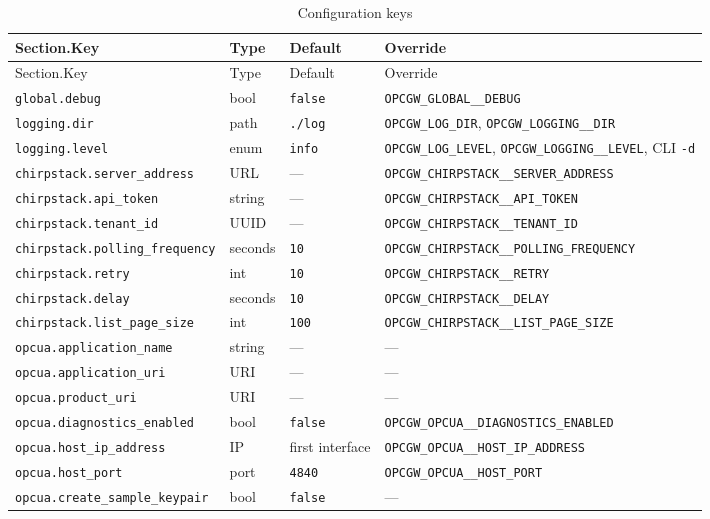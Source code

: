 \begin{longtable}[]{@{}llll@{}}
\caption{Configuration keys}\tabularnewline
\toprule\noalign{}
Section.Key & Type & Default & Override \\
\midrule\noalign{}
\endfirsthead
\toprule\noalign{}
Section.Key & Type & Default & Override \\
\midrule\noalign{}
\endhead
\bottomrule\noalign{}
\endlastfoot
\texttt{global.debug} & bool & \texttt{false} & \texttt{OPCGW\_GLOBAL\_\_DEBUG} \\
\texttt{logging.dir} & path & \texttt{./log} & \texttt{OPCGW\_LOG\_DIR}, \texttt{OPCGW\_LOGGING\_\_DIR} \\
\texttt{logging.level} & enum & \texttt{info} & \texttt{OPCGW\_LOG\_LEVEL}, \texttt{OPCGW\_LOGGING\_\_LEVEL}, CLI \texttt{-d} \\
\texttt{chirpstack.server\_address} & URL & --- & \texttt{OPCGW\_CHIRPSTACK\_\_SERVER\_ADDRESS} \\
\texttt{chirpstack.api\_token} & string & --- & \texttt{OPCGW\_CHIRPSTACK\_\_API\_TOKEN} \\
\texttt{chirpstack.tenant\_id} & UUID & --- & \texttt{OPCGW\_CHIRPSTACK\_\_TENANT\_ID} \\
\texttt{chirpstack.polling\_frequency} & seconds & \texttt{10} & \texttt{OPCGW\_CHIRPSTACK\_\_POLLING\_FREQUENCY} \\
\texttt{chirpstack.retry} & int & \texttt{10} & \texttt{OPCGW\_CHIRPSTACK\_\_RETRY} \\
\texttt{chirpstack.delay} & seconds & \texttt{10} & \texttt{OPCGW\_CHIRPSTACK\_\_DELAY} \\
\texttt{chirpstack.list\_page\_size} & int & \texttt{100} & \texttt{OPCGW\_CHIRPSTACK\_\_LIST\_PAGE\_SIZE} \\
\texttt{opcua.application\_name} & string & --- & --- \\
\texttt{opcua.application\_uri} & URI & --- & --- \\
\texttt{opcua.product\_uri} & URI & --- & --- \\
\texttt{opcua.diagnostics\_enabled} & bool & \texttt{false} & \texttt{OPCGW\_OPCUA\_\_DIAGNOSTICS\_ENABLED} \\
\texttt{opcua.host\_ip\_address} & IP & first interface & \texttt{OPCGW\_OPCUA\_\_HOST\_IP\_ADDRESS} \\
\texttt{opcua.host\_port} & port & \texttt{4840} & \texttt{OPCGW\_OPCUA\_\_HOST\_PORT} \\
\texttt{opcua.create\_sample\_keypair} & bool & \texttt{false} & --- \\

\end{longtable}
